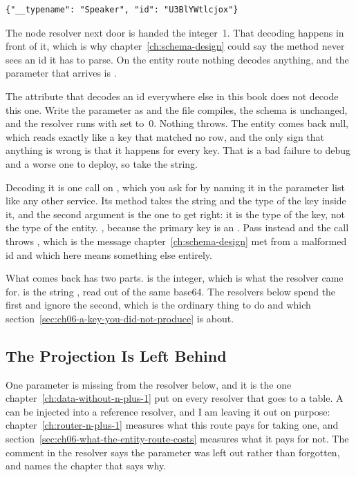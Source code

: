 \begin{verbatim}
{"__typename": "Speaker", "id": "U3BlYWtlcjox"}
\end{verbatim}

%
The node resolver next door is handed the integer~1. That decoding happens in
front of it, which is why chapter~\ref{ch:schema-design} could say the method
never sees an id it has to parse. On the entity route nothing decodes anything,
and the parameter that arrives is .

%
The attribute that decodes an id everywhere else in this book does not decode
this one. Write the parameter as  and the file
compiles, the schema is unchanged, and the resolver runs with  set
to~0. Nothing throws. The entity comes back null, which reads exactly like a key
that matched no row, and the only sign that anything is wrong is that it
happens for every key. That is a bad failure to debug and a worse one to deploy,
so take the string.

%
Decoding it is one call on , which you ask for by naming
it in the parameter list like any other service. Its  method takes
the string and the type of the key inside it, and the second argument is the one
to get right: it is the type of the key, not the type of the entity.
, because the primary key is an . Pass
 instead and the call throws , which is the message chapter~\ref{ch:schema-design} met
from a malformed id and which here means something else entirely.

%
What comes back has two parts.  is the integer, which is
what the resolver came for.  is the string
, read out of the same base64. The resolvers below spend the first
and ignore the second, which is the ordinary thing to do and which
section~\ref{sec:ch06-a-key-you-did-not-produce} is about.

\subsection{The Projection Is Left Behind}

%
%
One parameter is missing from the resolver below, and it is the one
chapter~\ref{ch:data-without-n-plus-1} put on every resolver that goes to a
table. A  can be injected into a reference resolver, and I
am leaving it out on purpose: chapter~\ref{ch:router-n-plus-1} measures what
this route pays for taking one, and
section~\ref{sec:ch06-what-the-entity-route-costs} measures what it pays for
not. The comment in the resolver says the parameter was left out rather than
forgotten, and names the chapter that says why.


